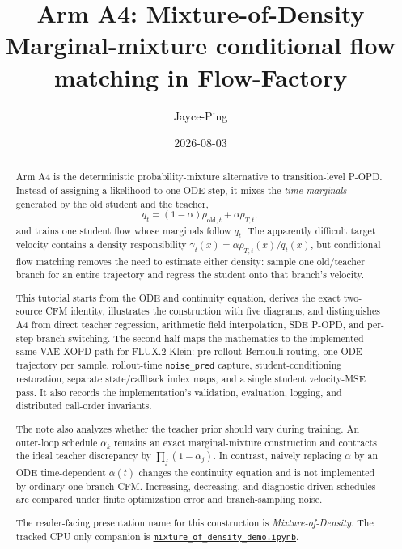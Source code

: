 \documentclass[11pt,a4paper]{article}
\title{\textbf{Arm A4: Mixture-of-Density}\\[0.35em]
\large Marginal-mixture conditional flow matching in Flow-Factory}
\author{Jayce-Ping}
\date{2026-08-03}
\theoremstyle{plain}
\theoremstyle{definition}
\begin{document}
\maketitle

\begin{abstract}
Arm A4 is the deterministic probability-mixture alternative to transition-level P-OPD.  Instead
of assigning a likelihood to one ODE step, it mixes the \emph{time marginals} generated by the old
student and the teacher,
\[
q_t=(1-\alpha)\rho_{\mathrm{old},t}+\alpha\rho_{T,t},
\]
and trains one student flow whose marginals follow $q_t$.  The apparently difficult target
velocity contains a density responsibility
$\gamma_t(x)=\alpha\rho_{T,t}(x)/q_t(x)$, but conditional flow matching removes the need to
estimate either density: sample one old/teacher branch for an entire trajectory and regress the
student onto that branch's velocity.

This tutorial starts from the ODE and continuity equation, derives the exact two-source CFM
identity, illustrates the construction with five diagrams, and distinguishes A4 from direct
teacher regression, arithmetic field interpolation, SDE P-OPD, and per-step branch switching.
The second half maps the mathematics to the implemented same-VAE XOPD path for
FLUX.2-Klein: pre-rollout Bernoulli routing, one ODE trajectory per sample, rollout-time
\texttt{noise\_pred} capture, student-conditioning restoration, separate state/callback index
maps, and a single student velocity-MSE pass.  It also records the implementation's validation,
evaluation, logging, and distributed call-order invariants.

The note also analyzes whether the teacher prior should vary during training.  An outer-loop
schedule $\alpha_k$ remains an exact marginal-mixture construction and contracts the ideal
teacher discrepancy by $\prod_j(1-\alpha_j)$.  In contrast, naively replacing $\alpha$ by an ODE
time-dependent $\alpha(t)$ changes the continuity equation and is not implemented by ordinary
one-branch CFM.  Increasing, decreasing, and diagnostic-driven schedules are compared under
finite optimization error and branch-sampling noise.

The reader-facing presentation name for this construction is \emph{Mixture-of-Density}.  The
tracked CPU-only companion is
\href{run:demos/mixture_of_density_demo.ipynb}
{\texttt{mixture\_of\_density\_demo.ipynb}}.
\end{abstract}

\tableofcontents
\newpage
\end{document}
